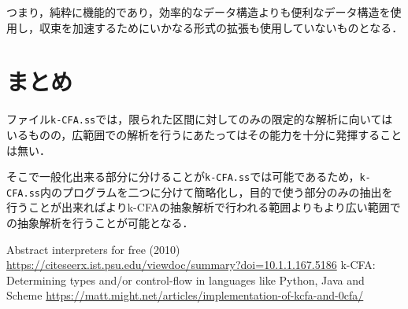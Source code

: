 \documentclass[twocolumn]{jsarticle}
\begin{document}
つまり，純粋に機能的であり，効率的なデータ構造よりも便利なデータ構造を使用し，収束を加速するためにいかなる形式の拡張も使用していないものとなる．
 
 
\section{まとめ}
ファイル\verb|k-CFA.ss|では，限られた区間に対してのみの限定的な解析に向いてはいるものの，広範囲での解析を行うにあたってはその能力を十分に発揮することは無い．
 
そこで一般化出来る部分に分けることが\verb|k-CFA.ss|では可能であるため，\verb|k-CFA.ss|内のプログラムを二つに分けて簡略化し，目的で使う部分のみの抽出を行うことが出来ればよりk-CFAの抽象解析で行われる範囲よりもより広い範囲での抽象解析を行うことが可能となる．
 

\begin{thebibliography}{99}
Abstract interpreters for free (2010)
\url{https://citeseerx.ist.psu.edu/viewdoc/summary?doi=10.1.1.167.5186}
 k-CFA: Determining types and/or control-flow in languages like Python, Java and Scheme \url{https://matt.might.net/articles/implementation-of-kcfa-and-0cfa/}
\end{thebibliography}
\end{document}
